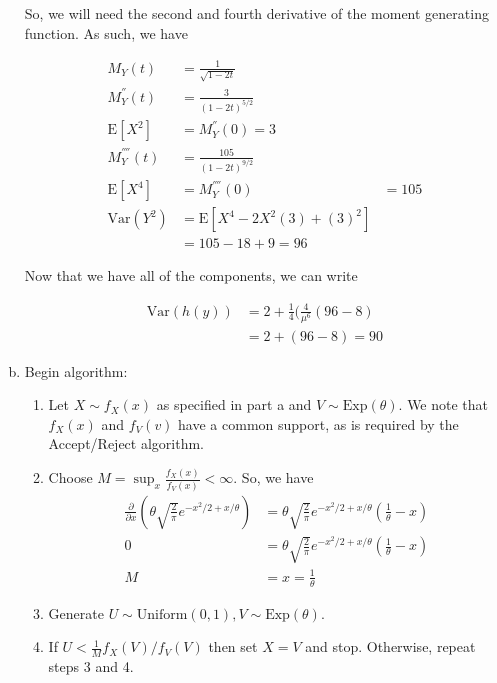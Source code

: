 \documentclass[11pt]{article}
\begin{document}
\begin{enumerate}[(a)]
    So, we will need the second and fourth derivative of the moment
    generating function.  As such, we have

    \begin{align*}
      M_Y(t) &= \frac{1}{\sqrt{1-2t}} \\
      M_Y^{''}(t) &= \frac{3}{(1-2t)^{5/2}} \\
      \mathrm{E}[X^2] &= M_Y^{''}(0) = 3 \\
      M_Y^{''''}(t) &= \frac{105}{(1-2t)^{9/2}} \\
      \mathrm{E}[X^4] &= M_Y^{''''}(0) &= 105 \\
      \mathrm{Var}(Y^2) &= \mathrm{E}[X^4 - 2X^2(3) + (3)^2] \\
      &= 105 - 18 + 9 = 96
    \end{align*}

    Now that we have all of the components, we can write

    \begin{align*}
      \mathrm{Var}(h(y)) &= 2 + \frac{1}{4}(\frac{4}{\mu^6}(96-8) \\
      &= 2 + (96-8) = 90
    \end{align*}

  \item Begin algorithm:
    \begin{enumerate}[(1)]
    \item Let $X \sim f_X(x)$ as specified in part a and
      $V \sim \mathrm{Exp}(\theta)$.  We note that $f_X(x)$ and
      $f_V(v)$ have a common support, as is required by the
      Accept/Reject algorithm.
    \item Choose $M = \sup_x \frac{f_X(x)}{f_V(x)} < \infty$.  So, we
      have
      \begin{align*}
        \frac{\partial}{\partial x} \left( \theta \sqrt{\frac{2}{\pi}}
        e^{-x^2/2 + x/\theta} \right) &= \theta \sqrt{\frac{2}{\pi}}
        e^{-x^2/2 + x/\theta} \left( \frac{1}{\theta} - x \right) \\
        0 &= \theta \sqrt{\frac{2}{\pi}} e^{-x^2/2 + x/\theta} \left(
            \frac{1}{\theta} - x \right) \\
        M &= x = \frac{1}{\theta}
      \end{align*}
    \item Generate $U \sim \mathrm{Uniform}(0,1), V \sim
      \mathrm{Exp}(\theta)$.
    \item If $U < \frac{1}{M} f_X(V)/f_V(V)$ then set $X=V$ and stop.
      Otherwise, repeat steps 3 and 4.
    \end{enumerate}


\end{enumerate}
\end{document}
